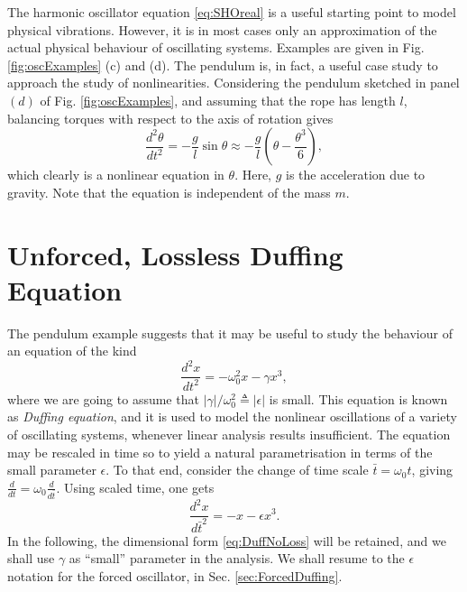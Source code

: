 \documentclass[11pt,twoside,a4paper,english]{book}
\begin{document}
The harmonic oscillator equation \eqref{eq:SHOreal} is a useful starting point to model physical vibrations. However, it is in most cases only an approximation of the actual physical behaviour of oscillating systems. Examples are given in Fig. \ref{fig:oscExamples} (c) and (d). The pendulum is, in fact, a useful case study to approach the study of nonlinearities. Considering the pendulum sketched in panel $(d)$ of Fig. \ref{fig:oscExamples}, and assuming that the rope has length $l$, balancing torques with respect to the axis of rotation gives
\begin{equation}
    \frac{d^2\theta}{dt^2} = - \frac{g}{l}\sin \theta \approx -\frac{g}{l}\left(\theta - \frac{\theta^3}{6} \right),
\end{equation}
which clearly is a nonlinear equation in $\theta$. Here, $g$ is the acceleration due to gravity. Note that the equation is independent of the mass $m$.

\section{Unforced, Lossless Duffing Equation}

The pendulum example suggests that it may be useful to study the behaviour of an equation of the kind
\begin{equation}\label{eq:DuffNoLoss}
    \frac{d^2 x}{dt^2} = -\omega_0^2 x - \gamma x^3,
\end{equation}
where we are going to assume that $|\gamma|/\omega_0^2 \triangleq |\epsilon|$ is small. This equation is known as \emph{Duffing equation}, and it is used to model the nonlinear oscillations of a variety of oscillating systems, whenever linear analysis results insufficient. The equation may be rescaled in time so to yield a natural parametrisation in terms of the small parameter $\epsilon$. To that end, consider the change of time scale $\bar t = \omega_0 t$, giving $\frac{d}{dt} = \omega_0 \frac{d} {d \bar t}$. Using scaled time, one gets
\begin{equation}
 \frac{d^2 x}{d\bar t^2} = - x - \epsilon x^3.
\end{equation}
In the following, the dimensional form \eqref{eq:DuffNoLoss} will be retained, and we shall use $\gamma$ as ``small'' parameter in the analysis. We shall resume to the $\epsilon$ notation for the forced oscillator, in Sec. \ref{sec:ForcedDuffing}.
 
\end{document}
